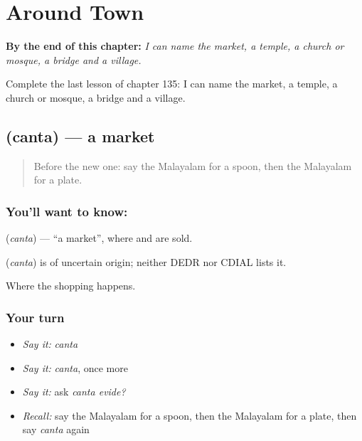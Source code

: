 
\chapter{Around Town}
\label{ch:ml-around-town}

\begin{chapteropening}
\textbf{By the end of this chapter:} \emph{I can name the market, a temple, a church or mosque, a bridge and a village.}

Complete the last lesson of chapter 135: I can name the market, a temple, a church or mosque, a bridge and a village.
\end{chapteropening}

\section[\texorpdfstring{\ml{ചന്ത} (canta)}{ചന്ത (canta)}]{ (canta) — a market}

\label{lesson:ML-C135-market}



\begin{quote}
Before the new one: say the Malayalam for a spoon, then the Malayalam for a plate.
\end{quote}

\subsection*{You'll want to know: }
\textbf{} (\emph{canta}) — \textquotedblleft{}a market\textquotedblright{}, where \textbf{} and \textbf{} are sold.

\begin{cousinweb}
\textbf{} (\emph{canta}) is of uncertain origin; neither DEDR nor CDIAL lists it.
\end{cousinweb}

\begin{grammarlens}[title={What you've built}]
Where the shopping happens.
\end{grammarlens}

\subsection*{Your turn}
\begin{itemize}
\raggedright
  \item \emph{Say it:} \emph{canta}
  \item \emph{Say it:} \emph{canta}, once more
  \item \emph{Say it:} ask \emph{canta evide?}
  \item \emph{Recall:} say the Malayalam for a spoon, then the Malayalam for a plate, then say \emph{canta} again
\end{itemize}

